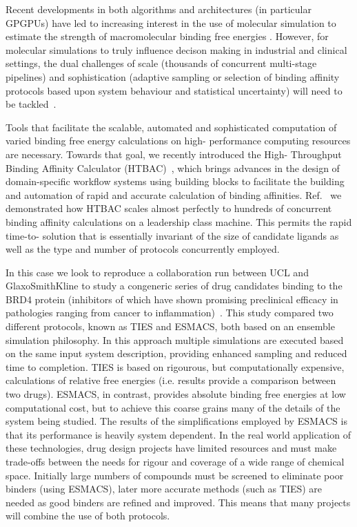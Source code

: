 Recent developments in both algorithms and architectures (in particular
GPGPUs) have led to increasing interest in the use of molecular simulation to
estimate the strength of macromolecular binding free energies
\cite{DeVivo2016}. However, for molecular simulations to truly influence
decison making in industrial and clinical settings, the dual challenges of
scale (thousands of concurrent multi-stage pipelines) and sophistication
(adaptive sampling or selection of binding affinity protocols based upon
system behaviour and statistical uncertainty) will need to be
tackled~\cite{XX}.


Tools that facilitate the scalable, automated and sophisticated computation of
varied binding free energy calculations on high- performance computing
resources are necessary. Towards that goal, we recently introduced the High-
Throughput Binding Affinity Calculator (HTBAC)~\cite{XX}, which brings
advances in the design of domain-specific workflow systems using building
blocks to facilitate the building and automation of rapid and accurate
calculation of binding affinities. Ref.~\cite{XX} we demonstrated how HTBAC
scales almost perfectly to hundreds of concurrent binding affinity
calculations on a leadership class machine. This permits the rapid time-to-
solution that is essentially invariant of the size of candidate ligands as
well as the type and number of protocols concurrently employed.

In this case we look to reproduce a collaboration run between UCL and
GlaxoSmithKline to study a congeneric series of drug candidates binding to the
BRD4 protein (inhibitors of which have shown promising preclinical efficacy in
pathologies ranging from cancer to inflammation)~\cite{Wan2017brd4}. This
study compared two different protocols, known as TIES and ESMACS, both based
on an ensemble simulation philosophy. In this approach multiple simulations
are executed based on the same input system description, providing enhanced
sampling and reduced time to completion. TIES is based on rigourous, but
computationally expensive, calculations of relative free energies (i.e.
results provide a comparison between two drugs). ESMACS, in contrast, provides
absolute binding free energies at low computational cost, but to achieve this
coarse grains many of the details of the system being studied. The results of
the simplifications employed by ESMACS is that its performance is heavily
system dependent. In the real world application of these technologies, drug
design projects have limited resources and must make trade-offs between the
needs for rigour and coverage of a wide range of chemical space. Initially
large numbers of compounds must be screened to eliminate poor binders (using
ESMACS), later more accurate methods (such as TIES) are needed as good binders
are refined and improved. This means that many projects will combine the use
of both protocols.

